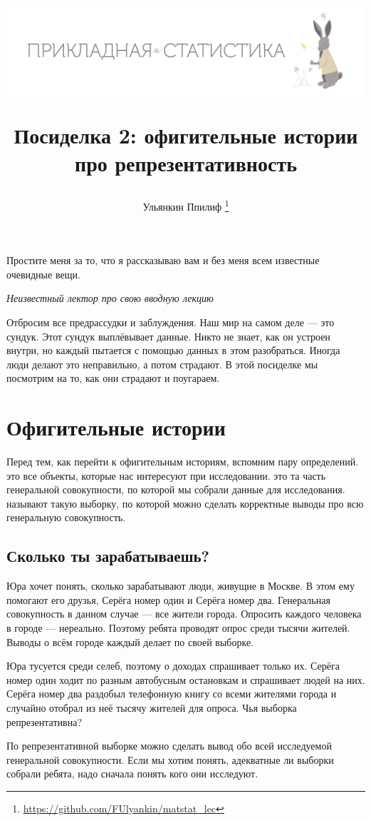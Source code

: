 \documentclass[12pt, a4paper, oneside]{article}
\title{
\begin{center} 
\includegraphics[width=0.99\textwidth]{logo.png}
\end{center}

Посиделка 2: офигительные истории про репрезентативность}
\date{ } %
\author{Ульянкин Ппилиф \thanks{\url{https://github.com/FUlyankin/matstat_lec}}}
\begin{document}

\maketitle

\epigraph{Простите меня за то, что я рассказываю вам и без меня всем известные очевидные вещи.}{\textit{Неизвестный лектор про свою вводную лекцию}}

Отбросим все предрассудки и заблуждения. Наш мир на самом деле --- это сундук. Этот сундук выплёвывает данные. Никто не знает, как он устроен внутри, но каждый пытается с помощью данных в этом разобраться. Иногда люди делают это неправильно, а потом страдают. В этой посиделке мы посмотрим на то, как они страдают и поугараем. 

\section{Офигительные истории}

Перед тем, как перейти к офигительным историям, вспомним пару определений.  это все объекты, которые нас интересуют при исследовании.   это та часть генеральной совокупности, по которой мы собрали данные для исследования.  называют такую выборку, по которой можно сделать корректные выводы про всю генеральную совокупность. 

\subsection{Сколько ты зарабатываешь?}

Юра хочет понять, сколько зарабатывают люди, живущие в Москве. В этом ему помогают его друзья, Серёга номер один и Серёга номер два. Генеральная совокупность в данном случае --- все жители города. Опросить каждого человека в городе --- нереально. Поэтому ребята проводят опрос среди тысячи жителей. Выводы о всём городе каждый делает по своей выборке.  

Юра тусуется среди селеб, поэтому о доходах спрашивает только их. Серёга номер один ходит по разным автобусным остановкам и спрашивает людей на них. Серёга номер два раздобыл телефонную книгу со всеми жителями города и случайно отобрал из неё тысячу жителей для опроса. Чья выборка репрезентативна? 

По репрезентативной выборке можно сделать вывод обо всей исследуемой генеральной совокупности. Если мы хотим понять, адекватные ли выборки собрали ребята, надо сначала понять кого они исследуют. 
\end{document}
